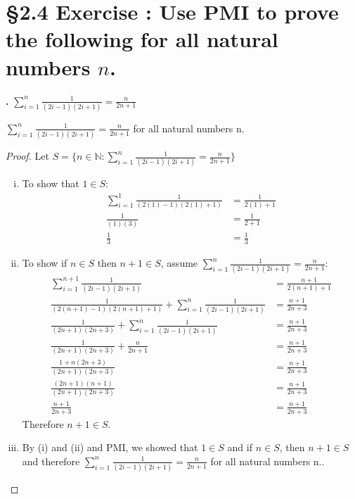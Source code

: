 \documentclass[a4paper,11pt]{article}
\begin{document}
\newpage

\setcounter{SubsectionCounter}{9}
\section*{\S 2.4 Exercise : Use PMI to prove the following for all natural numbers \(n\).}
\textbf{.}
\(\sum\limits_{i=1}^n\frac{1}{{(2i-1){(2i+1)}}}=\frac{n}{2n+1}\)
\begin{theorem1}
  \(\sum\limits_{i=1}^n\frac{1}{{(2i-1){(2i+1)}}}=\frac{n}{2n+1}\) for all natural numbers n.
\begin{proof}
  Let \(S = \{n \in \mathbb{N}: \sum\limits_{i=1}^n\frac{1}{{(2i-1){(2i+1)}}}=\frac{n}{2n+1}\}\)
  \begin{enumerate}[(i)]
    \item To show that \(1 \in S\):
    \begin{align*}
      \sum\limits_{i=1}^1\frac{1}{{(2(1)-1){(2(1)+1)}}} &= \frac{1}{2(1)+1}\\
      \frac{1}{{(1)}{(3)}} &= \frac{1}{2+1}\\
      \frac{1}{3} &= \frac{1}{3}
    \end{align*}
    \newpage
    \item To show if \(n \in S\) then \(n+1 \in S\), assume \(\sum\limits_{i=1}^n\frac{1}{{(2i-1){(2i+1)}}}=\frac{n}{2n+1}\):
    \begin{align*}
      \sum\limits_{i=1}^{n+1}\frac{1}{{(2i-1){(2i+1)}}} &= 
      \frac{n+1}{2{(n+1)}+1}\\
      \frac{1}{{(2{(n+1)}-1)}{(2{(n+1)}+1)}} + \sum\limits_{i=1}^{n}\frac{1}{{(2i-1){(2i+1)}}} 
      &= \frac{n+1}{2n+3}\\
      \frac{1}{{(2n+1)}{(2n+3)}} + \sum\limits_{i=1}^{n}\frac{1}{{(2i-1){(2i+1)}}} &= 
      \frac{n+1}{2n+3}\\
      \frac{1}{{(2n+1)}{(2n+3)}} + \frac{n}{2n+1} &= \frac{n+1}{2n+3}\\
      \frac{1+n{(2n+3)}}{{(2n+1)}{(2n+3)}} &= \frac{n+1}{2n+3}\\
      \frac{{(2n+1)}{(n+1)}}{{(2n+1)}{(2n+3)}} &= \frac{n+1}{2n+3}\\
      \frac{n+1}{2n+3} &= \frac{n+1}{2n+3}
    \end{align*}
    Therefore \(n+1 \in S\).
    \item By (i) and (ii) and PMI, we showed that \(1 \in S\) and if \(n \in S\), then \(n+1 \in S\) and therefore  \(\sum\limits_{i=1}^n\frac{1}{{(2i-1){(2i+1)}}}=\frac{n}{2n+1}\) for all natural numbers n..
  \end{enumerate}
\end{proof}  
\end{theorem1}
\end{document}
